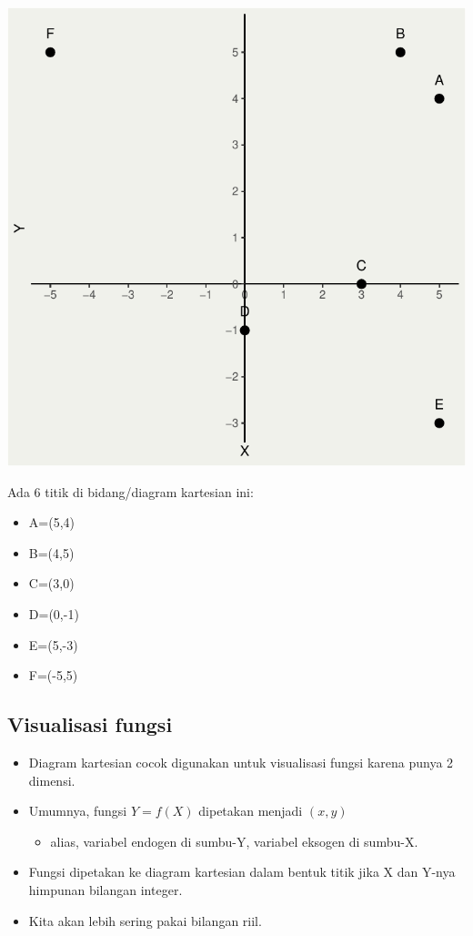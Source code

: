 \documentclass[
  letterpaper,
  DIV=11,
  numbers=noendperiod]{scrartcl}
\providecommand{\tightlist}{%
  \setlength{\itemsep}{0pt}\setlength{\parskip}{0pt}}\usepackage{longtable,booktabs,array}
\begin{document}
\includegraphics{index_files/figure-pdf/unnamed-chunk-1-1.pdf}

Ada 6 titik di bidang/diagram kartesian ini:

\begin{itemize}
\tightlist
\item
  A=(5,4)
\item
  B=(4,5)
\item
  C=(3,0)
\item
  D=(0,-1)
\item
  E=(5,-3)
\item
  F=(-5,5)
\end{itemize}

\subsection{Visualisasi fungsi}\label{visualisasi-fungsi}

\begin{itemize}
\item
  Diagram kartesian cocok digunakan untuk visualisasi fungsi karena
  punya 2 dimensi.
\item
  Umumnya, fungsi \(Y=f(X)\) dipetakan menjadi \((x,y)\)

  \begin{itemize}
  \tightlist
  \item
    alias, variabel endogen di sumbu-Y, variabel eksogen di sumbu-X.
  \end{itemize}
\item
  Fungsi dipetakan ke diagram kartesian dalam bentuk titik jika X dan
  Y-nya himpunan bilangan integer.
\item
  Kita akan lebih sering pakai bilangan riil.
\end{itemize}
\end{document}
